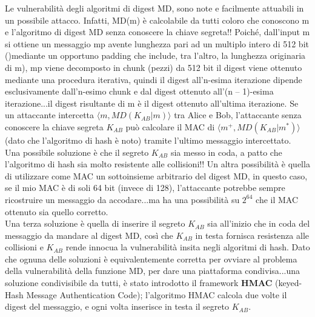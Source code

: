 Le vulnerabilità degli algoritmi di digest MD, sono note e facilmente attuabili in un possibile attacco.
Infatti, MD(m) è calcolabile da tutti coloro che conoscono m e l’algoritmo di digest MD senza conoscere la chiave 
segreta!!
Poiché, dall’input m si ottiene un messaggio mp avente lunghezza pari ad un multiplo intero di 512 bit ()mediante un opportuno padding che include, tra l’altro, la lunghezza originaria di m), mp viene decomposto in chunk (pezzi) da 512 bit il digest viene ottenuto mediante una procedura iterativa, quindi il digest all’n-esima iterazione dipende esclusivamente dall’n-esimo chunk e dal digest ottenuto all’(n – 1)-esima iterazione...il digest risultante di m è il digest ottenuto all’ultima iterazione.
Se un attaccante intercetta $\langle m, MD(K_{AB}|m) \rangle$ tra Alice e Bob, l'attaccante senza conoscere la chiave segreta $K_{AB}$ può calcolare il MAC di $\langle m^{+}, MD(K_{AB}|m^{*}) \rangle$ (dato che l'algoritmo di hash è noto) tramite l'ultimo messaggio intercettato. \\
Una possibile soluzione è che il segreto $K_{AB}$ sia messo in coda, a patto che l'algoritmo di hash sia molto resistente alle collisioni!! Un altra possibilità è quella di utilizzare come MAC un sottoinsieme arbitrario del digest MD, in questo caso, se il mio MAC è di soli 64 bit (invece di 128), l'attaccante potrebbe sempre ricostruire un messaggio da accodare...ma ha una possibilità su $2^{64}$ che il MAC ottenuto sia quello corretto.
\\
Una terza soluzione è quella di inserire il segreto $K_{AB}$ sia all'inizio che in coda del messaggio da mandare al digest MD, così che $K_{AB}$ in testa fornisca resistenza alle collisioni e $K_{AB}$ rende innocua la vulnerabilità insita negli algoritmi di hash.
Dato che ognuna delle soluzioni è equivalentemente corretta per ovviare al problema della vulnerabilità della funzione MD, per dare una piattaforma condivisa...una soluzione condivisibile da tutti, è stato introdotto il framework \textbf{HMAC} (keyed-Hash Message Authentication Code); l'algoritmo HMAC calcola due volte il digest del messaggio, e ogni volta inserisce in testa il segreto $K_{AB}$.
